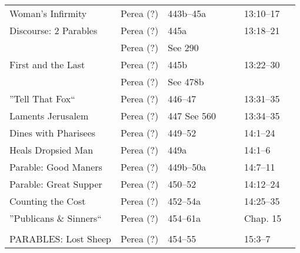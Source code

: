 \begin{longtable}[h]{l@{\hspace{0.5em}}l@{\hspace{0.5em}}l@{\hspace{0.5em}}BBBB}
Woman's Infirmity                          & Perea (?)           & 443b--45a          &                   &                    & 13:10--17             & \\
Discourse: 2 Parables                      & Perea (?)           & 445a               &                   &                    & 13:18--21             & \\
                                           & Perea (?)           & See 290            &                   &                    &                       & \\
First and the Last                         & Perea (?)           & 445b               &                   &                    & 13:22--30             & \\
                                           & Perea (?)           & See 478b           &                   &                    &                       & \\
''Tell That Fox``                          & Perea (?)           & 446--47            &                   &                    & 13:31--35             & \\
Laments Jerusalem                          & Perea (?)           & 447 See 560        &                   &                    & 13:34--35             & \\
Dines with Pharisees                       & Perea (?)           & 449--52            &                   &                    & 14:1--24              & \\
\quad Heals Dropsied Man                   & Perea (?)           & 449a               &                   &                    & 14:1--6               & \\
\quad Parable: Good Maners                 & Perea (?)           & 449b--50a          &                   &                    & 14:7--11              & \\
\quad Parable: Great Supper                & Perea (?)           & 450--52            &                   &                    & 14:12--24             & \\
Counting the Cost                          & Perea (?)           & 452--54a           &                   &                    & 14:25--35             & \\
''Publicans \& Sinners``                   & Perea (?)           & 454--61a           &                   &                    & Chap. 15              & \\
\\
PARABLES: Lost Sheep                       & Perea (?)           & 454--55            &                   &                    & 15:3--7               & \\

\end{longtable}

